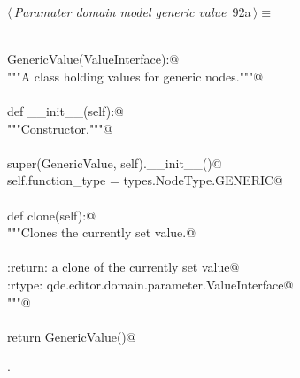 \documentclass[
    a4paper,      %
    10pt,         %
    openright,    %
    notitlepage,  %
    parskip=half, %
]{scrreprt}       %
\theoremstyle{definition}                    %
\begin{document}
\begin{flushleft} \small
\begin{minipage}{\linewidth}\label{scrap150}\raggedright\small
{} $\langle\,${\itshape Paramater domain model generic value}\nobreak\ {\footnotesize {92a}}$\,\rangle\equiv$
\vspace{-1exm}
\begin{list}{}{} \item
\mbox{}\lstinline@@\\
\mbox{}\lstinline@class GenericValue(ValueInterface):@\\
\mbox{}\lstinline@    """A class holding values for generic nodes."""@\\
\mbox{}\lstinline@@\\
\mbox{}\lstinline@    def __init__(self):@\\
\mbox{}\lstinline@        """Constructor."""@\\
\mbox{}\lstinline@@\\
\mbox{}\lstinline@        super(GenericValue, self).__init__()@\\
\mbox{}\lstinline@        self.function_type = types.NodeType.GENERIC@\\
\mbox{}\lstinline@@\\
\mbox{}\lstinline@    def clone(self):@\\
\mbox{}\lstinline@        """Clones the currently set value.@\\
\mbox{}\lstinline@@\\
\mbox{}\lstinline@        :return: a clone of the currently set value@\\
\mbox{}\lstinline@        :rtype:  qde.editor.domain.parameter.ValueInterface@\\
\mbox{}\lstinline@        """@\\
\mbox{}\lstinline@@\\
\mbox{}\lstinline@        return GenericValue()@{\NWsep}
\end{list}
\vspace{-1.5ex}
\footnotesize
\begin{list}{}{\setlength{\itemsep}{-\parsep}\setlength{\itemindent}{-\leftmargin}}
\item {\NWtxtMacroNoRef}.

\item{}
\end{list}
\end{minipage}\vspace{4ex}
\end{flushleft}
\end{document}
